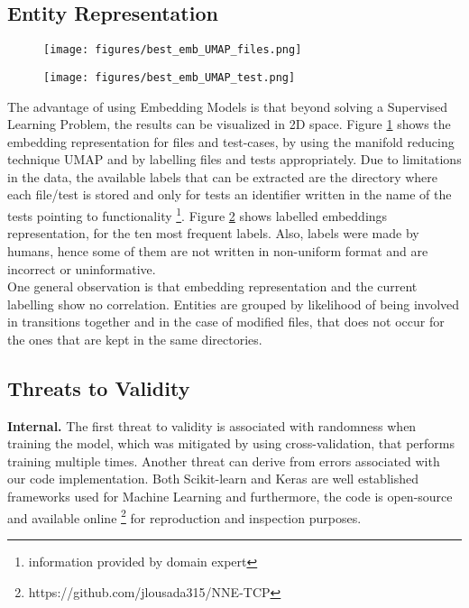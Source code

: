 \subsection{Entity Representation}

\begin{figure}[t]
\centering
\texttt{[image: figures/best\_emb\_UMAP\_files.png]}
\label{fig:sub1}
\end{figure}

\begin{figure}[t]
	\centering
	\texttt{[image: figures/best\_emb\_UMAP\_test.png]}
	\label{fig:sub2}
\end{figure}



The advantage of using Embedding Models is that beyond solving a Supervised Learning Problem, the results can be visualized in 2D space. Figure \ref{fig:sub1} shows the embedding representation for files and test-cases, by using the manifold reducing technique UMAP and by labelling files and tests appropriately. Due to limitations in the data, the available labels that can be extracted are the directory where each file/test is stored and only for tests an identifier written in the name of the tests pointing to functionality \footnote{information provided by domain expert}. Figure \ref{fig:sub2} shows labelled embeddings representation, for the ten most frequent labels. Also, labels were made by humans, hence some of them are not written in non-uniform  format and are incorrect or uninformative.
\\

One general observation is that embedding representation and the current labelling show no correlation. Entities are grouped by likelihood of being involved in transitions together and in the case of modified files, that does not occur for the ones that are kept in the same directories. 

\subsection{Threats to Validity}
\textbf{Internal.} The first threat to validity is associated with randomness when training the model, which was mitigated by using cross-validation, that performs training multiple times. 
Another threat can derive from errors associated with our code implementation. Both Scikit-learn and Keras are well established frameworks used for Machine Learning and furthermore, the code is open-source and available online \footnote{https://github.com/jlousada315/NNE-TCP} for reproduction and inspection purposes. \\


